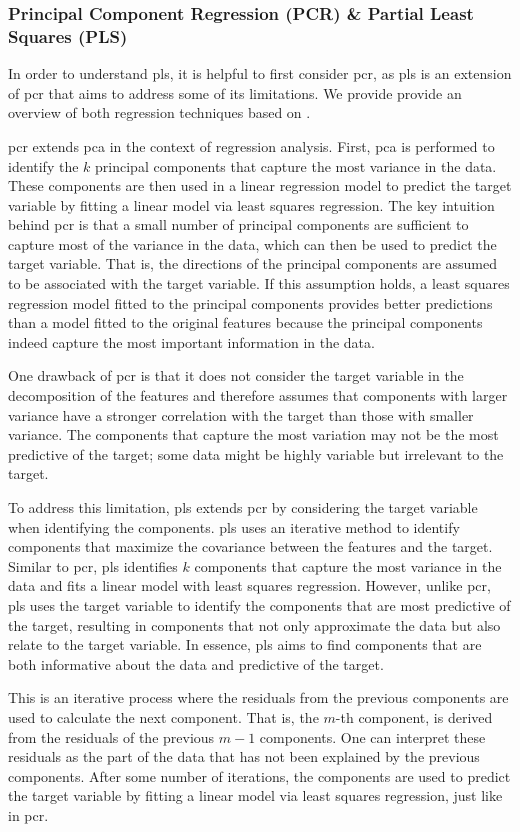 \subsubsection{Principal Component Regression (PCR) \& Partial Least Squares (PLS)}\label{subsec:pls}
In order to understand \gls{pls}, it is helpful to first consider \gls{pcr}, as \gls{pls} is an extension of \gls{pcr} that aims to address some of its limitations.
We provide provide an overview of both regression techniques based on \citet{James2023AnIS}.

\gls{pcr} extends \gls{pca} in the context of regression analysis.
First, \gls{pca} is performed to identify the $k$ principal components that capture the most variance in the data.
These components are then used in a linear regression model to predict the target variable by fitting a linear model via least squares regression.
The key intuition behind \gls{pcr} is that a small number of principal components are sufficient to capture most of the variance in the data, which can then be used to predict the target variable.
That is, the directions of the principal components are assumed to be associated with the target variable.
If this assumption holds, a least squares regression model fitted to the principal components provides better predictions than a model fitted to the original features because the principal components indeed capture the most important information in the data.

One drawback of \gls{pcr} is that it does not consider the target variable in the decomposition of the features and therefore assumes that components with larger variance have a stronger correlation with the target than those with smaller variance.
The components that capture the most variation may not be the most predictive of the target; some data might be highly variable but irrelevant to the target.

To address this limitation, \gls{pls} extends \gls{pcr} by considering the target variable when identifying the components.
\gls{pls} uses an iterative method to identify components that maximize the covariance between the features and the target.
Similar to \gls{pcr}, \gls{pls} identifies $k$ components that capture the most variance in the data and fits a linear model with least squares regression.
However, unlike \gls{pcr}, \gls{pls} uses the target variable to identify the components that are most predictive of the target, resulting in components that not only approximate the data but also relate to the target variable.
In essence, \gls{pls} aims to find components that are both informative about the data and predictive of the target.

This is an iterative process where the residuals from the previous components are used to calculate the next component.
That is, the $m$-th component, is derived from the residuals of the previous $m-1$ components.
One can interpret these residuals as the part of the data that has not been explained by the previous components.
After some number of iterations, the components are used to predict the target variable by fitting a linear model via least squares regression, just like in \gls{pcr}.